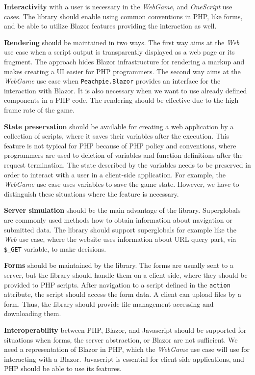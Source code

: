 \par
\textbf{Interactivity} with a user is necessary in the \textit{WebGame}, and \textit{OneScript} use cases.
The library should enable using common conventions in PHP, like forms, and be able to utilize Blazor features providing the interaction as well.
\par
\textbf{Rendering} should be maintained in two ways.
The first way aims at the \textit{Web} use case when a script output is transparently displayed as a web page or its fragment.
The approach hides Blazor infrastructure for rendering a markup and makes creating a UI easier for PHP programmers.
The second way aims at the \textit{WebGame} use case when \texttt{Peachpie.Blazor} provides an interface for the interaction with Blazor.
It is also necessary when we want to use already defined components in a PHP code.
The rendering should be effective due to the high frame rate of the game.
\par
\textbf{State preservation} should be available for creating a web application by a collection of scripts, where it saves their variables after the execution.
This feature is not typical for PHP because of PHP policy and conventions, where programmers are used to deletion of variables and function definitions after the request termination.
The state described by the variables needs to be preserved in order to interact with a user in a client-side application. 
For example, the \textit{WebGame} use case uses variables to save the game state. 
However, we have to distinguish these situations where the feature is necessary.
\par
\textbf{Server simulation} should be the main advantage of the library.
Superglobals are commonly used methods how to obtain information about navigation or submitted data.
The library should support superglobals for example like the \textit{Web} use case, where the website uses information about URL query part, via \texttt{\$\_GET} variable, to make decisions.
\par
\textbf{Forms} should be maintained by the library. 
The forms are usually sent to a server, but the library should handle them on a client side, where they should be provided to PHP scripts.
After navigation to a script defined in the \texttt{action} attribute, the script should access the form data.
A client can upload files by a form.
Thus, the library should provide file management accessing and downloading them.
\par
\textbf{Interoperability} between PHP, Blazor, and Javascript should be supported for situations when forms, the server abstraction, or Blazor are not sufficient.
We need a representation of Blazor in PHP, which the \textit{WebGame} use case will use for interacting with a Blazor.
Javascript is essential for client side applications, and PHP should be able to use its features.

